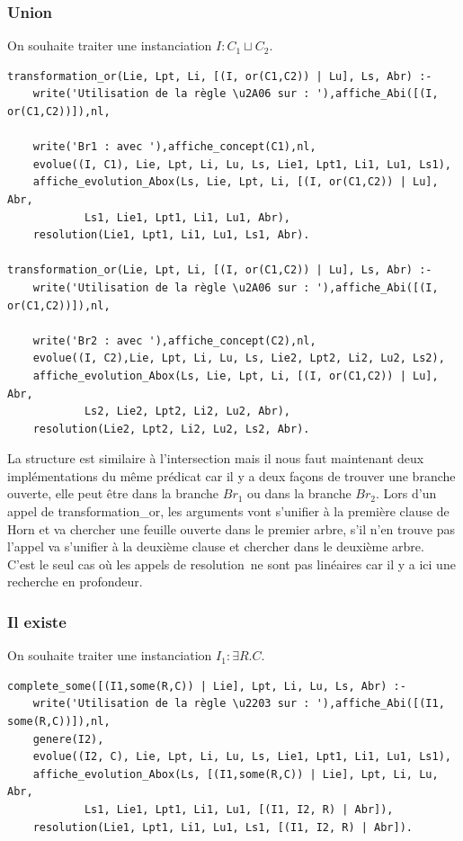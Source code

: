 \documentclass{article}
\begin{document}
\subsubsection{Union}
On souhaite traiter une instanciation $I:C_1\sqcup C_2$.
\begin{verbatim}
transformation_or(Lie, Lpt, Li, [(I, or(C1,C2)) | Lu], Ls, Abr) :- 
	write('Utilisation de la règle \u2A06 sur : '),affiche_Abi([(I, or(C1,C2))]),nl,
 
	write('Br1 : avec '),affiche_concept(C1),nl,
	evolue((I, C1), Lie, Lpt, Li, Lu, Ls, Lie1, Lpt1, Li1, Lu1, Ls1),
	affiche_evolution_Abox(Ls, Lie, Lpt, Li, [(I, or(C1,C2)) | Lu], Abr,
            Ls1, Lie1, Lpt1, Li1, Lu1, Abr),
	resolution(Lie1, Lpt1, Li1, Lu1, Ls1, Abr).
	
transformation_or(Lie, Lpt, Li, [(I, or(C1,C2)) | Lu], Ls, Abr) :- 
	write('Utilisation de la règle \u2A06 sur : '),affiche_Abi([(I, or(C1,C2))]),nl,
 
	write('Br2 : avec '),affiche_concept(C2),nl,
	evolue((I, C2),Lie, Lpt, Li, Lu, Ls, Lie2, Lpt2, Li2, Lu2, Ls2),
	affiche_evolution_Abox(Ls, Lie, Lpt, Li, [(I, or(C1,C2)) | Lu], Abr,
            Ls2, Lie2, Lpt2, Li2, Lu2, Abr),
	resolution(Lie2, Lpt2, Li2, Lu2, Ls2, Abr).
\end{verbatim}

La structure est similaire à l'intersection mais il nous faut maintenant deux implémentations du même prédicat car il y a deux façons de trouver une branche ouverte, elle peut être dans la branche $Br_1$ ou dans la branche $Br_2$. Lors d'un appel de \color{blue}transformation\_or\color{black}, les arguments vont s'unifier à la première clause de Horn et va chercher une feuille ouverte dans le premier arbre, s'il n'en trouve pas l'appel va s'unifier à la deuxième clause et chercher dans le deuxième arbre. \\

C'est le seul cas où les appels de \color{blue}resolution\color{black}\ ne sont pas linéaires car il y a ici une recherche en profondeur.
\subsubsection{Il existe}
On souhaite traiter une instanciation $I_1:\exists R.C$.
\begin{verbatim}
complete_some([(I1,some(R,C)) | Lie], Lpt, Li, Lu, Ls, Abr) :-
	write('Utilisation de la règle \u2203 sur : '),affiche_Abi([(I1, some(R,C))]),nl,
	genere(I2),
	evolue((I2, C), Lie, Lpt, Li, Lu, Ls, Lie1, Lpt1, Li1, Lu1, Ls1),
	affiche_evolution_Abox(Ls, [(I1,some(R,C)) | Lie], Lpt, Li, Lu, Abr,
            Ls1, Lie1, Lpt1, Li1, Lu1, [(I1, I2, R) | Abr]),
	resolution(Lie1, Lpt1, Li1, Lu1, Ls1, [(I1, I2, R) | Abr]).
\end{verbatim}
\end{document}
